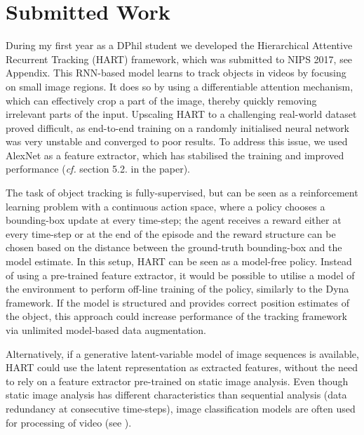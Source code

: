 \section{Submitted Work}
\label{sec:done}

    During my first year as a DPhil student we developed the Hierarchical Attentive Recurrent Tracking (HART) framework, which was submitted to NIPS 2017, see Appendix. 
    This RNN-based model learns to track objects in videos by focusing on small image regions. It does so by using a differentiable attention mechanism, which can effectively crop a part of the image, thereby quickly removing irrelevant parts of the input.
    Upscaling HART to a challenging real-world dataset proved difficult, as end-to-end training on a randomly initialised neural network was very unstable and converged to poor results. 
    To address this issue, we used AlexNet \citep{Krizhevsky2012} as a feature extractor, which has stabilised the training and improved performance (\emph{cf.} section 5.2. in the paper).
    
    The task of object tracking is fully-supervised, but can be seen as a reinforcement learning problem \citep{Zhang2017a} with a continuous action space, where a policy chooses a bounding-box update at every time-step; the agent receives a reward either at every time-step or at the end of the episode and the reward structure can be chosen based on the distance between the ground-truth bounding-box and the model estimate. In this setup, HART can be seen as a model-free policy. Instead of using a pre-trained feature extractor, it would be possible to utilise a model of the environment to perform off-line training of the policy, similarly to the Dyna framework. If the model is structured and provides correct position estimates of the object, this approach could increase performance of the tracking framework via unlimited model-based data augmentation.
    
    Alternatively, if a generative latent-variable model of image sequences is available, HART could use the latent representation as extracted features, without the need to rely on a feature extractor pre-trained on static image analysis. Even though static image analysis has different characteristics than sequential analysis (\!\eg data redundancy at consecutive time-steps), image classification models are often used for processing of video (see\! \eg \cite{Ning2016a}). 
    
